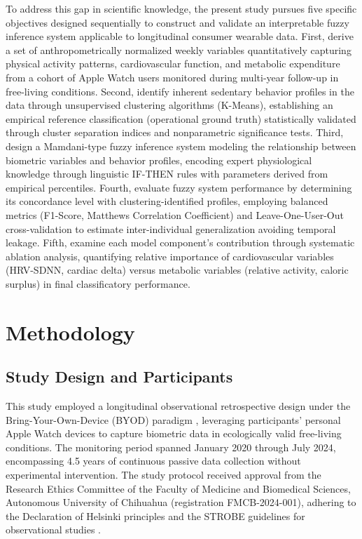 \documentclass[journal,twoside,web]{ieeecolor}
\begin{document}
To address this gap in scientific knowledge, the present study pursues five specific objectives designed sequentially to construct and validate an interpretable fuzzy inference system applicable to longitudinal consumer wearable data. First, derive a set of anthropometrically normalized weekly variables quantitatively capturing physical activity patterns, cardiovascular function, and metabolic expenditure from a cohort of Apple Watch users monitored during multi-year follow-up in free-living conditions. Second, identify inherent sedentary behavior profiles in the data through unsupervised clustering algorithms (K-Means), establishing an empirical reference classification (operational ground truth) statistically validated through cluster separation indices and nonparametric significance tests. Third, design a Mamdani-type fuzzy inference system modeling the relationship between biometric variables and behavior profiles, encoding expert physiological knowledge through linguistic IF-THEN rules with parameters derived from empirical percentiles. Fourth, evaluate fuzzy system performance by determining its concordance level with clustering-identified profiles, employing balanced metrics (F1-Score, Matthews Correlation Coefficient) and Leave-One-User-Out cross-validation to estimate inter-individual generalization avoiding temporal leakage. Fifth, examine each model component's contribution through systematic ablation analysis, quantifying relative importance of cardiovascular variables (HRV-SDNN, cardiac delta) versus metabolic variables (relative activity, caloric surplus) in final classificatory performance.


\section{Methodology}
\label{sec:methodology}

\subsection{Study Design and Participants}
\label{subsec:design}

This study employed a longitudinal observational retrospective design under the Bring-Your-Own-Device (BYOD) paradigm \cite{Liu2022}, leveraging participants' personal Apple Watch devices to capture biometric data in ecologically valid free-living conditions. The monitoring period spanned January 2020 through July 2024, encompassing 4.5 years of continuous passive data collection without experimental intervention. The study protocol received approval from the Research Ethics Committee of the Faculty of Medicine and Biomedical Sciences, Autonomous University of Chihuahua (registration FMCB-2024-001), adhering to the Declaration of Helsinki principles \cite{WMA2013} and the STROBE guidelines for observational studies \cite{VonElm2007STROBE}.
\end{document}
